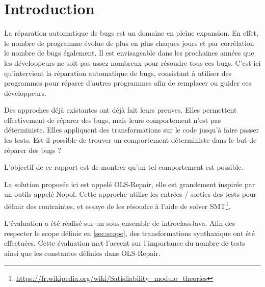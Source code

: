 \chapter*{Introduction}
	\thispagestyle{introduction}


\par La réparation automatique de bugs est un domaine en pleine expansion. En effet, le nombre de programme évolue de plus en plus chaques jours et par corrélation le nombre de bugs également. Il est envisageable dans les prochaines années que les développeurs ne soit pas assez nombreux pour résoudre tous ces bugs. C'est ici qu'intervient la réparation automatique de bugs, consistant à utiliser des programmes pour réparer d'autres programmes afin de remplacer ou guider ces développeurs.  

\par Des approches déjà existantes\cite{genprog}\cite{semfix} ont déjà fait leurs preuves. Elles permettent effectivement de réparer des bugs, mais leurs comportement n'est pas déterministe. Elles appliquent des transformations sur le code jusqu'à faire passer les tests. Est-il possible de trouver un comportement déterministe dans le but de réparer des bugs ?

\par L'objectif de ce rapport est de montrer qu'un tel comportement est possible.

\par La solution proposée ici est appelé OLS-Repair, elle est grandement inspirée par un outils appelé Nopol\cite{nopol}. Cette approche utilise les entrées / sorties des tests pour définir des contraintes, et essaye de les résoudre à l'aide de solver SMT\footnote{\url{https://fr.wikipedia.org/wiki/Satisfiability_modulo_theories}}.


\par L'évaluation a été réalisé sur un sous-ensemble de introclassJava. Afin des respecter le scope définie en \ref{sec:scope}, des transformations synthaxique ont été effectuées. Cette évaluation met l'accent sur l'importance du nombre de tests ainsi que les constantes définies dans OLS-Repair.